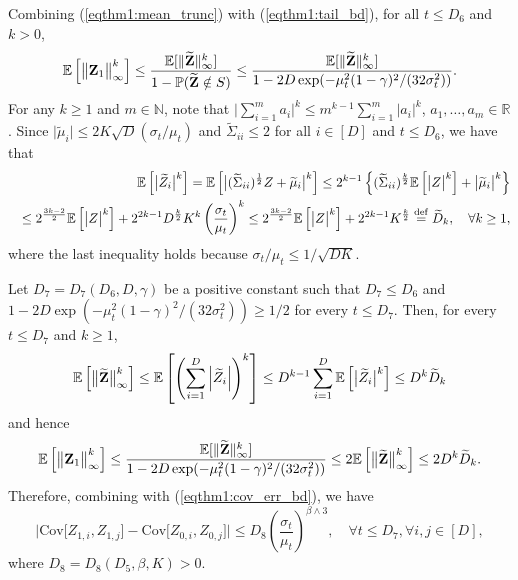 \documentclass[11pt,a4paper,final]{article}
\numberwithin{equation}{section}
\theoremstyle{remark}
\newcommand{\bZ}{{\bf Z}}
\newcommand{\bbE}{{\mathbb E}}
\newcommand{\bbR}{{\mathbb R}}
\newcommand{\bbN}{{\mathbb N}}
\newcommand{\bbP}{{\mathbb P}}
\newcommand{\be}{\begin{equation}}
\newcommand{\ee}{\end{equation}}
\newcommand{\bean}{\setlength\arraycolsep{1pt}\begin{eqnarray*}}
\newcommand{\eean}{\end{eqnarray*}}
\def\defeq{ \stackrel{\rm def}{=} }
\begin{document}
Combining (\ref{eqthm1:mean_trunc}) with (\ref{eqthm1:tail_bd}), for all $t \leq D_{6}$ and $k > 0$,
\bean
\bbE \left[ \big\| \bZ_{1} \big\|_{\infty}^{k} \right]
\leq \frac{ \bbE [ \| \widetilde \bZ \|_{\infty}^{k} ] }{1 - \bbP ( \widetilde \bZ \notin S )}
\leq \frac{ \bbE [ \| \widetilde \bZ \|_{\infty}^{k} ] }{1 - 2D \exp ( - \mu_{t}^2 (1-\gamma)^2 / ( 32 \sigma_{t}^2) )}.
\eean
For any $k \geq 1$ and $m \in \bbN$, note that $ \vert \sum_{i=1}^{m} a_i \vert ^{k} \leq m^{k-1}  \sum_{i=1}^{m} \vert a_i \vert ^{k}$, $a_1,\ldots,a_{m} \in \bbR$.
Since $\vert \widetilde \mu_i \vert \leq 2 K \sqrt{ D }  (\sigma_{t} / \mu_t)$ and $\widetilde \Sigma_{ii} \leq 2$ for all $i \in [D]$ and $ t \leq D_{6}$, we have that
\bean
&& \bbE \left[ \big\vert \widetilde Z_i \big\vert^{k} \right]
= \bbE \left[ \big\vert ( \widetilde \Sigma_{ii} )^{\frac{1}{2}} Z + \widetilde \mu_i \big\vert^{k} \right]
\leq 2^{k-1} \left\{ (\widetilde \Sigma_{ii})^{\frac{k}{2}} \bbE \left[ \big\vert Z \big\vert^{k} \right] + \big\vert \widetilde \mu_i \big\vert^{k} \right\}
\\
&& \leq 2^{\frac{3k-2}{2}} \bbE \left[ \big\vert Z \big\vert^{k} \right]
+ 2^{2k-1} D^{\frac{k}{2}} K^k \left( \frac{\sigma_{t}}{\mu_t} \right)^{k}
\leq 2^{\frac{3k-2}{2}} \bbE \left[ \big\vert Z \big\vert^{k} \right] + 2^{2k-1} K^{\frac{k}{2}}
\defeq \widetilde  D_{k},
\quad \forall k \geq 1,
\eean
where the last inequality holds because $\sigma_{t} /\mu_{t} \leq 1/\sqrt{DK}$.

Let $D_{7} = D_{7} (D_{6}, D, \gamma )$ be a positive constant such that $D_{7} \leq D_{6}$ and $1 - 2D \exp ( - \mu_{t}^2 ( 1- \gamma )^2 / (32 \sigma_{t}^2) ) \geq 1/2$ for every $t \leq D_{7}$.
Then, for every $t \leq D_{7}$ and $k \geq 1$,
\be
\bbE \left[ \big\| \widetilde \bZ \big\|_{\infty}^{k} \right]
\leq \bbE \left[ \left( \sum_{i=1}^{D} \left\vert \widetilde Z_i \right\vert \right)^{k} \right]
\leq D^{k-1} \sum_{i=1}^{D} \bbE \left[ \big\vert \widetilde Z_i \big\vert^k \right]
\leq D^{k} \widetilde   D_{k}
\label{eqthm1:ztilde_mom_bd}
\ee
and hence
\be
\bbE \left[ \big\| \bZ_{1} \big\|_{\infty}^{k} \right] 
\leq \frac{ \bbE [ \| \widetilde \bZ \|_{\infty}^{k} ] }{ 1 - 2D \exp ( - \mu_{t}^2 (1-\gamma)^2 / (32 \sigma_{t}^2) )}
\leq 2 \bbE \left[ \big\| \widetilde \bZ \big\|_{\infty}^{k} \right]
\leq 2 D^{k} \widetilde   D_{k}.
\label{eqthm1:z1_mom_bd}
\ee
Therefore, combining with (\ref{eqthm1:cov_err_bd}), we have
\be
\Big\vert \text{Cov} \big[ Z_{1,i}, Z_{1,j} \big] - \text{Cov} \big[ Z_{0,i}, Z_{0,j} \big] \Big\vert
\leq D_{8} \left( \frac{\sigma_{t}}{\mu_{t}} \right)^{\beta \wedge 3},
\quad \forall t \leq D_{7}, \forall i,j \in [D],
\label{eqthm1:cov_taylor_bd}
\ee
where $D_{8} = D_{8} ( D_{5}, \beta, K ) > 0$. 
\end{document}
